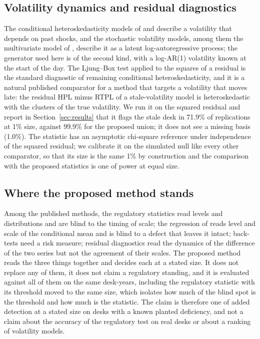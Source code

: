 \subsection{Volatility dynamics and residual diagnostics}
\label{sec:rw-volatility}

The conditional heteroskedasticity models of \citet{engle1982} and \citet{bollerslev1986} describe a volatility that depends on past shocks, and the stochastic volatility models, among them the multivariate model of \citet{harvey1994}, describe it as a latent log-autoregressive process; the generator used here is of the second kind, with a log-AR(1) volatility known at the start of the day.
The Ljung--Box test \citep{ljung1978} applied to the squares of a residual is the standard diagnostic of remaining conditional heteroskedasticity, and it is a natural published comparator for a method that targets a volatility that moves late: the residual HPL minus RTPL of a stale-volatility model is heteroskedastic with the clusters of the true volatility.
We run it on the squared residual and report in Section~\ref{sec:results} that it flags the stale desk in 71.9\% of replications at 1\% size, against 99.9\% for the proposed union; it does not see a missing basis (1.0\%).
The statistic has an asymptotic chi-square reference under independence of the squared residual; we calibrate it on the simulated null like every other comparator, so that its size is the same 1\% by construction and the comparison with the proposed statistics is one of power at equal size.

\subsection{Where the proposed method stands}
\label{sec:rw-position}

Among the published methods, the regulatory statistics read levels and distributions and are blind to the timing of scale; the regression of \citet{mincer1969} reads level and scale of the conditional mean and is blind to a defect that leaves it intact; back-tests need a risk measure; residual diagnostics read the dynamics of the difference of the two series but not the agreement of their scales.
The proposed method reads the three things together and decides each at a stated size.
It does not replace any of them, it does not claim a regulatory standing, and it is evaluated against all of them on the same desk-years, including the regulatory statistic with its threshold moved to the same size, which isolates how much of the blind spot is the threshold and how much is the statistic.
The claim is therefore one of added detection at a stated size on desks with a known planted deficiency, and not a claim about the accuracy of the regulatory test on real desks or about a ranking of volatility models.
